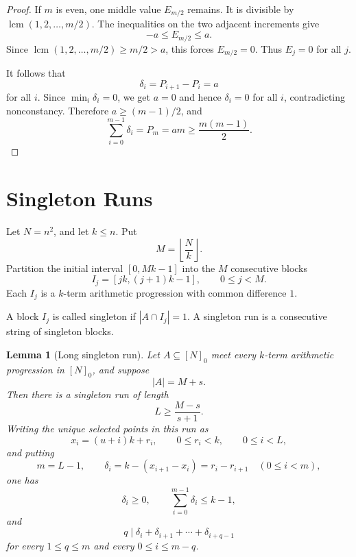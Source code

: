 \documentclass[10pt,a4paper]{amsart}
\newtheorem{lemma}[theorem]{Lemma}
\newcommand{\lcm}{\operatorname{lcm}}
\newcommand{\floor}[1]{\left\lfloor #1\right\rfloor}
\numberwithin{equation}{section}
\begin{document}
\begin{proof}
If $m$ is even, one middle value $E_{m/2}$ remains.
It is divisible by $\lcm(1,2,\ldots,m/2)$.
The inequalities on the two adjacent increments give
\[
        -a\le E_{m/2}\le a.
\]
Since $\lcm(1,2,\ldots,m/2)\ge m/2>a$, this forces $E_{m/2}=0$.
Thus $E_j=0$ for all $j$.

It follows that
\[
        \delta_i=P_{i+1}-P_i=a
\]
for all $i$.
Since $\min_i\delta_i=0$, we get $a=0$ and hence $\delta_i=0$ for all $i$, contradicting nonconstancy.
Therefore $a\ge(m-1)/2$, and
\[
        \sum_{i=0}^{m-1}\delta_i=P_m=am\ge \frac{m(m-1)}2.
\]
\end{proof}

\section{Singleton Runs}

Let $N=n^2$, and let $k\le n$.
Put
\[
        M=\floor{\frac{N}{k}}.
\]
Partition the initial interval $[0,Mk-1]$ into the $M$ consecutive blocks
\[
        I_j=[jk,(j+1)k-1],
        \qquad
        0\le j<M.
\]
Each $I_j$ is a $k$-term arithmetic progression with common difference $1$.

A block $I_j$ is called singleton if $|A\cap I_j|=1$.
A singleton run is a consecutive string of singleton blocks.

\begin{lemma}[Long singleton run]\label{lem:run}
Let $A\subseteq[N]_0$ meet every $k$-term arithmetic progression in $[N]_0$, and suppose
\[
        |A|=M+s.
\]
Then there is a singleton run of length
\[
        L\ge \frac{M-s}{s+1}.
\]
Writing the unique selected points in this run as
\[
        x_i=(u+i)k+r_i,
        \qquad
        0\le r_i<k,
        \qquad
        0\le i<L,
\]
and putting
\[
        m=L-1,
        \qquad
        \delta_i=k-(x_{i+1}-x_i)=r_i-r_{i+1}
        \quad (0\le i<m),
\]
one has
\[
        \delta_i\ge0,
        \qquad
        \sum_{i=0}^{m-1}\delta_i\le k-1,
\]
and
\[
        q\mid \delta_i+\delta_{i+1}+\cdots+\delta_{i+q-1}
\]
for every $1\le q\le m$ and every $0\le i\le m-q$.
\end{lemma}
\end{document}
